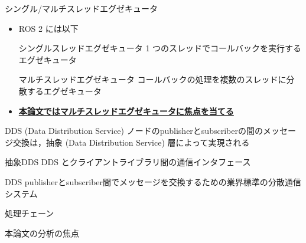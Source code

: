 \begin{frame}{シングル/マルチスレッドエグゼキュータ}
    \begin{itemize}
        \item ROS 2 には以下 
              \begin{block}{シングルスレッドエグゼキュータ}
                  1 つのスレッドでコールバックを実行するエグゼキュータ
              \end{block}
              \begin{block}{マルチスレッドエグゼキュータ}
                  コールバックの処理を複数のスレッドに分散するエグゼキュータ
              \end{block}
              \vspace{5mm}

        \item \textbf{\underline{本論文ではマルチスレッドエグゼキュータに焦点を当てる}}
    \end{itemize}
\end{frame}

\begin{frame}{DDS (Data Distribution Service)}
    ノードのpublisherとsubscriberの間のメッセージ交換は，抽象 (Data Distribution Service) 層によって実現される

    \begin{block}{抽象DDS}
        DDS とクライアントライブラリ間の通信インタフェース
    \end{block}
    \begin{block}{DDS}
        publisherとsubscriber間でメッセージを交換するための業界標準の分散通信システム
    \end{block}
\end{frame}

\begin{frame}{処理チェーン}
\end{frame}

\begin{frame}{本論文の分析の焦点}

\end{frame}


